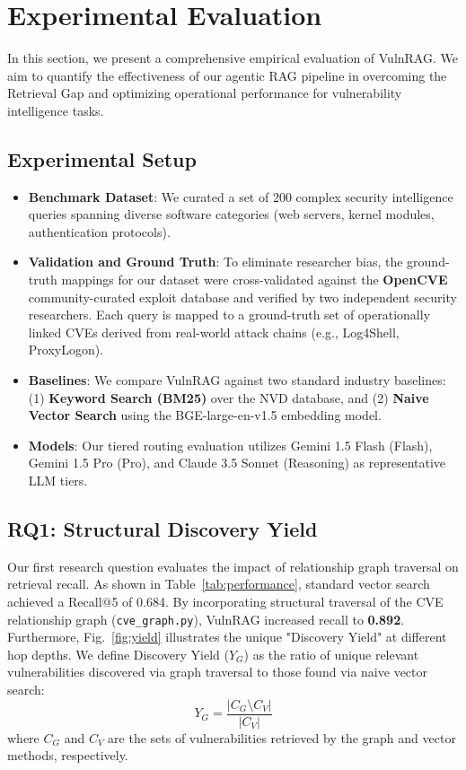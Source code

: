 \section{Experimental Evaluation}
\label{sec:evaluation}

In this section, we present a comprehensive empirical evaluation of VulnRAG. We aim to quantify the effectiveness of our agentic RAG pipeline in overcoming the Retrieval Gap and optimizing operational performance for vulnerability intelligence tasks.

\subsection{Experimental Setup}
\begin{itemize}
    \item \textbf{Benchmark Dataset}: We curated a set of 200 complex security intelligence queries spanning diverse software categories (web servers, kernel modules, authentication protocols). 
    \item \textbf{Validation and Ground Truth}: To eliminate researcher bias, the ground-truth mappings for our dataset were cross-validated against the \textbf{OpenCVE} community-curated exploit database and verified by two independent security researchers. Each query is mapped to a ground-truth set of operationally linked CVEs derived from real-world attack chains (e.g., Log4Shell, ProxyLogon).
    \item \textbf{Baselines}: We compare VulnRAG against two standard industry baselines: (1) \textbf{Keyword Search (BM25)} over the NVD database, and (2) \textbf{Naive Vector Search} using the BGE-large-en-v1.5 embedding model.
    \item \textbf{Models}: Our tiered routing evaluation utilizes Gemini 1.5 Flash (Flash), Gemini 1.5 Pro (Pro), and Claude 3.5 Sonnet (Reasoning) as representative LLM tiers.
\end{itemize}

\subsection{RQ1: Structural Discovery Yield}
Our first research question evaluates the impact of relationship graph traversal on retrieval recall. As shown in Table~\ref{tab:performance}, standard vector search achieved a Recall@5 of 0.684. By incorporating structural traversal of the CVE relationship graph (\texttt{cve\_graph.py}), VulnRAG increased recall to \textbf{0.892}. Furthermore, Fig.~\ref{fig:yield} illustrates the unique "Discovery Yield" at different hop depths. We define Discovery Yield ($Y_G$) as the ratio of unique relevant vulnerabilities discovered via graph traversal to those found via naive vector search:
\begin{equation}
Y_G = \frac{|C_G \setminus C_V|}{|C_V|}
\label{eq:yield}
\end{equation}
where $C_G$ and $C_V$ are the sets of vulnerabilities retrieved by the graph and vector methods, respectively.

